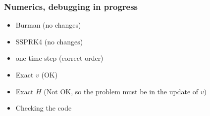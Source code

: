 \documentclass[pt12]{beamer}
\begin{document}
\begin{frame}
\frametitle{Numerics, debugging in progress}

\begin{itemize}
\item Burman (no changes)
\item SSPRK4 (no changes)
\item one time-step (correct order)
\item Exact $v$ (OK)
\item Exact $H$ (Not OK, so the problem must be in the update of $v$)
\item Checking the code
\end{itemize}


\end{frame}
\end{document}
